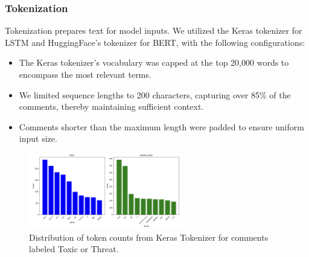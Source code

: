     \subsubsection{Tokenization}
        Tokenization prepares text for model inputs. We utilized the Keras tokenizer for LSTM and HuggingFace's tokenizer for BERT, with the following configurations:
        \begin{itemize}
            \item The Keras tokenizer's vocabulary was capped at the top 20,000 words to encompass the most relevant terms.
            \item We limited sequence lengths to 200 characters, capturing over 85\% of the comments, thereby maintaining sufficient context.
            \item Comments shorter than the maximum length were padded to ensure uniform input size.
        \end{itemize}

        \begin{figure}
            \centering
            \includegraphics[width=0.6\textwidth]{images/data_analysis/LSTM_WordCount.png}
            \caption{Distribution of token counts from Keras Tokenizer for comments labeled Toxic or Threat.}
            \label{fig:token_counts}
        \end{figure}
